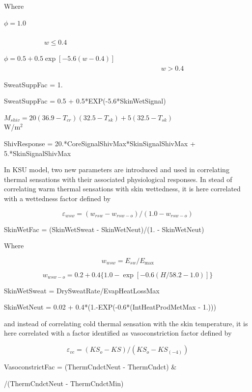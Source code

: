 Where

\(\phi = 1.0\) ~~~~~~~~~~~~~~~~~~~~~~~~~~~~~~~~~~~~~~~~~~~~~~~~~~~~~~~~~~~~~~~~~~~~~~~~~~~~~~~~~~~ \(w \le 0.4\)

\(\phi = 0.5 + 0.5\exp [ - 5.6(w - 0.4)]\) ~~~~~~~~~~~~~~~~~~~~~~~~~~~~~~~~~~~~~~~~~~~~~ \(w > 0.4\)

SweatSuppFac = 1.

SweatSuppFac = 0.5 + 0.5*EXP(-5.6*SkinWetSignal)

\({M_{shiv}} = 20(36.9 - {T_{cr}})(32.5 - {T_{sk}}) + 5(32.5 - {T_{sk}})\) ~~~~~~~~~~~~~~~~~~~~ W/m\(^{2}\)

ShivResponse = 20.*CoreSignalShivMax*SkinSignalShivMax + 5.*SkinSignalShivMax

In KSU model, two new parameters are introduced and used in correlating thermal sensations with their associated physiological responses. In stead of correlating warm thermal sensations with skin wettedness, it is here correlated with a wettedness factor defined by

\begin{equation}
{\varepsilon_{wsw}} = ({w_{rsw}} - {w_{rsw - o}})/(1.0 - {w_{rsw - o}})
\end{equation}

SkinWetFac = (SkinWetSweat - SkinWetNeut)/(1. - SkinWetNeut)

Where

\begin{equation}
{w_{wsw}} = {E_{sw}}/{E_{\max }}
\end{equation}

\begin{equation}
{w_{wsw - o}} = 0.2 + 0.4\{ 1.0 - \exp [ - 0.6(H/58.2 - 1.0)]\}
\end{equation}

SkinWetSweat = DrySweatRate/EvapHeatLossMax

SkinWetNeut = 0.02 + 0.4*(1.-EXP(-0.6*(IntHeatProdMetMax - 1.)))

and instead of correlating cold thermal sensation with the skin temperature, it is here correlated with a factor identified as vasoconstriction factor defined by

\begin{equation}
{\varepsilon_{vc}} = (K{S_o} - KS)/(K{S_o} - K{S_{( - 4)}})
\end{equation}

VasoconstrictFac = (ThermCndctNeut - ThermCndct) \&

/(ThermCndctNeut - ThermCndctMin)


